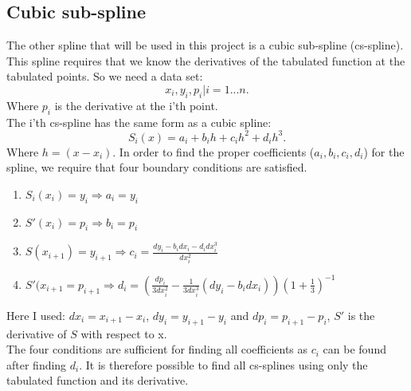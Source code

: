 \documentclass{article}
\begin{document}
\subsection{Cubic sub-spline}
The other spline that will be used in this project is a cubic sub-spline (cs-spline). This spline requires 
that we know the derivatives of the tabulated function at the tabulated points. So we need a data set:
\begin{equation}
\label{eq:cs1}
x_i,y_i,p_i | i=1...n.
\end{equation}
Where $p_i$ is the derivative at the i'th point.
\\
The i'th cs-spline has the same form as a cubic spline:
\begin{equation}
\label{eq:cs2}
S_i(x)=a_i+b_i h + c_i h^2 +d_i h^3.
\end{equation}
Where $h=(x-x_i)$.
In order to find the proper coefficients ($a_i, b_i, c_i, d_i$) for the spline, we require that four boundary conditions are 
satisfied.
\begin{enumerate}
\item $S_i(x_i)=y_i \Rightarrow a_i=y_i$
\item $S'(x_i) = p_i \Rightarrow b_i=p_i$
\item $S(x_{i+1}) = y_{i+1} \Rightarrow c_i = \frac{dy_i-b_i dx_i -d_i dx_i^3}{dx_i^2}$
\item $S'(x_{i+1} = p_{i+1} \Rightarrow d_i = \left(\frac{dp_i}{3 dx_i^2}-\frac{1}{3 dx_i^3}(dy_i-b_i dx_i)
\right) \left(1+\frac{1}{3}\right)^{-1}$
\end{enumerate}
Here I used: $dx_i=x_{i+1}-x_i$, $dy_i=y_{i+1}-y_i$ and $dp_i=p_{i+1}-p_{i}$, $S'$ is the derivative of 
$S$ with respect to x.
\\
The four conditions are sufficient for finding all coefficients as 
$c_i$ can be found after finding $d_i$. It is therefore possible to find all 
cs-splines using only the tabulated function and its derivative.
 
\end{document}

